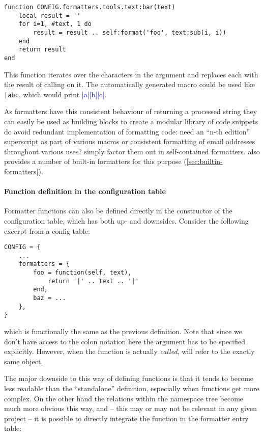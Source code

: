 \documentclass{scrartcl}
\begin{document}
\begin{verbatim}
function CONFIG.formatters.tools.text:bar(text)
    local result = ''
    for i=1, #text, 1 do
        result = result .. self:format('foo', text:sub(i, i))
    end
    return result
end
\end{verbatim}

\noindent This function iterates over the characters in the 
argument and replaces each with the result of calling  on it.  The
automatically generated macro could be used like \texttt{\bar{abc}},
which would print \textcolor{blue}{|a||b||c|}.

\medskip As formatters have this consistent behaviour of returning a processed
string they can easily be used as building blocks to create a modular library of
code snippets do avoid redundant implementation of formatting code: need an
“n-th edition” superscript as part of various macros or consistent formatting of
email addresses throughout various uses? simply factor them out in
self-contained formatters.   also provides a number of
built-in formatters for this purpose (\vref{sec:builtin-formatters}).


\paragraph{Function definition in the configuration table}

Formatter functions can also be defined directly in the constructor of the
configuration table, which has both up- and downsides.  Consider the following
excerpt from a config table:

\begin{verbatim}
CONFIG = {
    ...
    formatters = {
        foo = function(self, text),
            return '|' .. text .. '|'
        end,
        baz = ...
    },
}
\end{verbatim}

\noindent which is functionally the same as the previous definition.  Note that
since we don't have access to the colon notation here the  argument
has to be specified explicitly.  However, when the function is actually
\emph{called},  will refer to the exactly same object.

The major downside to this way of defining functions is that it tends to become
less readable than the “standalone” definition, especially when functions get
more complex.  On the other hand the relations within the namespace tree become
much more obvious this way, and -- this may or may not be relevant in any given
project -- it is possible to directly integrate the function in the formatter
entry table:
\end{document}
